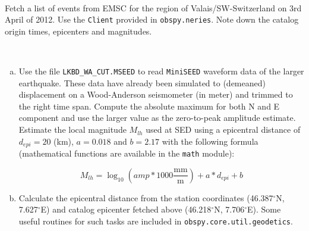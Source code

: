\documentclass{LMUexercise}
\begin{document}
\\
Fetch a list of events from EMSC for the region of Valais/SW-Switzerland on 3rd April
of 2012. Use the \verb#Client# provided in \verb#obspy.neries#. Note down the
catalog origin times, epicenters and magnitudes.
\vspace*{2.5em}

\\
\begin{enumerate}[a)]
\item
Use the file \verb#LKBD_WA_CUT.MSEED# to read \verb#MiniSEED# waveform data of
the larger earthquake. These data have already been simulated to (demeaned)
displacement on a Wood-Anderson seismometer (in meter) and trimmed to the right
time span. Compute the absolute maximum for both N and E component and use the
larger value as the zero-to-peak amplitude estimate. Estimate the local
magnitude $M_{lh}$ used at SED using a epicentral distance of $d_{epi}=20$
(km), $a=0.018$ and $b=2.17$ with the following formula (mathematical functions
are available in the \verb#math# module):

\[
M_{lh} = \log_{10}\left(amp * 1000\mathrm{\frac{mm}{m}}\right) + a * d_{epi} + b
\]
\item
Calculate the epicentral distance from the station coordinates
(46.387$^\circ$N, 7.627$^\circ$E) and catalog epicenter fetched above
(46.218$^\circ$N, 7.706$^\circ$E). Some useful routines for such tasks are
included in \verb#obspy.core.util.geodetics#.
\end{enumerate}
\vspace*{3.0em}
\end{document}
